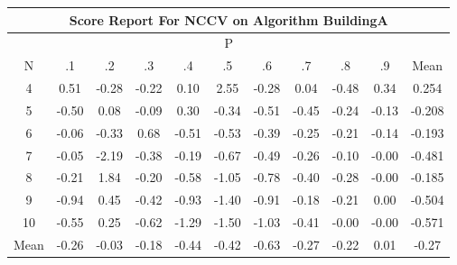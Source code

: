 \documentclass[11pt,a4paper]{report}
\begin{document}
\begin{longtable}{ | c || c | c | c | c | c | c | c | c | c || c |}
\hline
\multicolumn{11}{|c|}{ Score Report For NCCV on Algorithm BuildingA} \\
\hline
\multicolumn{11}{|c|}{ P } \\
\hline
N & .1 & .2 & .3 & .4 & .5 & .6 & .7 & .8 & .9 & Mean\\
 \hline
 \hline
 \endhead
  4 &  \cellcolor[HTML]{EFEFFF} 0.51 &  \cellcolor[HTML]{FFF7F7} -0.28 &  \cellcolor[HTML]{FFF7F7} -0.22 &  \cellcolor[HTML]{FFFFFF} 0.10 &  \cellcolor[HTML]{BFBFFF} 2.55 &  \cellcolor[HTML]{FFF7F7} -0.28 &  \cellcolor[HTML]{FFFFFF} 0.04 &  \cellcolor[HTML]{FFEFEF} -0.48 &  \cellcolor[HTML]{F7F7FF} 0.34 & 0.254 \\
  5 &  \cellcolor[HTML]{FFEFEF} -0.50 &  \cellcolor[HTML]{FFFFFF} 0.08 &  \cellcolor[HTML]{FFFFFF} -0.09 &  \cellcolor[HTML]{F7F7FF} 0.30 &  \cellcolor[HTML]{FFF7F7} -0.34 &  \cellcolor[HTML]{FFEFEF} -0.51 &  \cellcolor[HTML]{FFF7F7} -0.45 &  \cellcolor[HTML]{FFF7F7} -0.24 &  \cellcolor[HTML]{FFFFFF} -0.13 & -0.208 \\
  6 &  \cellcolor[HTML]{FFFFFF} -0.06 &  \cellcolor[HTML]{FFF7F7} -0.33 &  \cellcolor[HTML]{EFEFFF} 0.68 &  \cellcolor[HTML]{FFEFEF} -0.51 &  \cellcolor[HTML]{FFEFEF} -0.53 &  \cellcolor[HTML]{FFF7F7} -0.39 &  \cellcolor[HTML]{FFF7F7} -0.25 &  \cellcolor[HTML]{FFF7F7} -0.21 &  \cellcolor[HTML]{FFFFFF} -0.14 & -0.193 \\
  7 &  \cellcolor[HTML]{FFFFFF} -0.05 &  \cellcolor[HTML]{FFC7C7} -2.19 &  \cellcolor[HTML]{FFF7F7} -0.38 &  \cellcolor[HTML]{FFF7F7} -0.19 &  \cellcolor[HTML]{FFEFEF} -0.67 &  \cellcolor[HTML]{FFEFEF} -0.49 &  \cellcolor[HTML]{FFF7F7} -0.26 &  \cellcolor[HTML]{FFFFFF} -0.10 &  \cellcolor[HTML]{FFFFFF} -0.00 & -0.481 \\
  8 &  \cellcolor[HTML]{FFF7F7} -0.21 &  \cellcolor[HTML]{CFCFFF} 1.84 &  \cellcolor[HTML]{FFF7F7} -0.20 &  \cellcolor[HTML]{FFEFEF} -0.58 &  \cellcolor[HTML]{FFE7E7} -1.05 &  \cellcolor[HTML]{FFEFEF} -0.78 &  \cellcolor[HTML]{FFF7F7} -0.40 &  \cellcolor[HTML]{FFF7F7} -0.28 &  \cellcolor[HTML]{FFFFFF} -0.00 & -0.185 \\
  9 &  \cellcolor[HTML]{FFE7E7} -0.94 &  \cellcolor[HTML]{F7F7FF} 0.45 &  \cellcolor[HTML]{FFF7F7} -0.42 &  \cellcolor[HTML]{FFE7E7} -0.93 &  \cellcolor[HTML]{FFDFDF} -1.40 &  \cellcolor[HTML]{FFE7E7} -0.91 &  \cellcolor[HTML]{FFF7F7} -0.18 &  \cellcolor[HTML]{FFF7F7} -0.21 &  \cellcolor[HTML]{FFFFFF} 0.00 & -0.504 \\
  10 &  \cellcolor[HTML]{FFEFEF} -0.55 &  \cellcolor[HTML]{F7F7FF} 0.25 &  \cellcolor[HTML]{FFEFEF} -0.62 &  \cellcolor[HTML]{FFDFDF} -1.29 &  \cellcolor[HTML]{FFD7D7} -1.50 &  \cellcolor[HTML]{FFE7E7} -1.03 &  \cellcolor[HTML]{FFF7F7} -0.41 &  \cellcolor[HTML]{FFFFFF} -0.00 &  \cellcolor[HTML]{FFFFFF} -0.00 & -0.571 \\
 \hline
 \hline
Mean &  \cellcolor[HTML]{FFF7F7} -0.26 &  \cellcolor[HTML]{FFFFFF} -0.03 &  \cellcolor[HTML]{FFF7F7} -0.18 &  \cellcolor[HTML]{FFF7F7} -0.44 &  \cellcolor[HTML]{FFF7F7} -0.42 &  \cellcolor[HTML]{FFEFEF} -0.63 &  \cellcolor[HTML]{FFF7F7} -0.27 &  \cellcolor[HTML]{FFF7F7} -0.22 &  \cellcolor[HTML]{FFFFFF} 0.01 &  \cellcolor[HTML]{FFF7F7} -0.27
\end{longtable}
\end{document}
